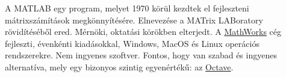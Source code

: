 A MATLAB egy program, melyet 1970 körül kezdtek el fejleszteni mátrixszámítások megkönnyítésére.
Elnevezése a MATrix LABoratory rövidítéséből ered. Mérnöki, oktatási körökben elterjedt.
A \href{http://www.mathworks.com}{MathWorks} cég fejleszti, évenkénti kiadásokkal, 
Windows, MacOS és Linux operációs rendszerekre. Nem ingyenes szoftver.
\vfil\eject
\Dnew
Fontos, hogy van szabad és ingyenes alternatíva, mely egy bizonyos szintig egyenértékű: az 
\href{https://www.gnu.org/software/octave/download.html}{Octave}.